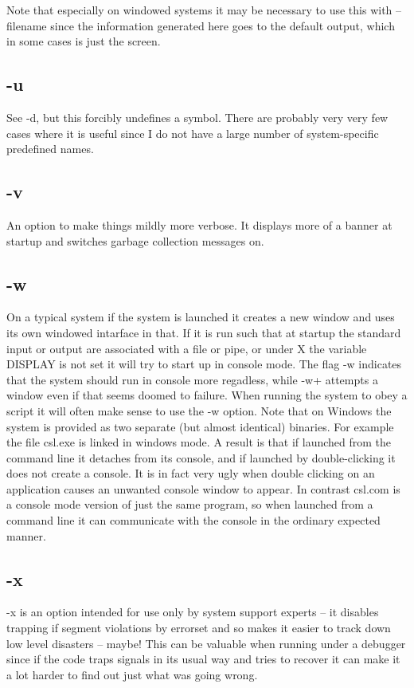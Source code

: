 \documentclass[a4paper,11pt]{article}
\begin{document}
Note that especially on windowed systems it may be necessary to use this
with {\ttfamily -- filename} since the information generated here goes to
the default output, which in some cases is just the screen.
\subsection{\ttfamily -u}
See {\ttfamily -d}, but this forcibly undefines a symbol. There are probably
very very few cases where it is useful since I do not have a large
number of system-specific predefined names.
\subsection{\ttfamily -v}
An option to make things mildly more verbose. It displays more of a banner
at startup and switches garbage collection messages on.
\subsection{\ttfamily -w}
On a typical system if the system is launched it creates a new window and uses
its own windowed intarface in that. If it is run such that at startup the
standard input or output are associated with a file or pipe, or under X the
variable {\ttfamily DISPLAY} is not set it will try to start up in console
mode. The flag {\ttfamily -w} indicates that the system should run in console
more regadless, while {\ttfamily -w+} attempts a window even if that seems
doomed to failure. When running the system to obey a script it will often make
sense to use the {\ttfamily -w} option. Note that on Windows the system is
provided as two separate (but almost identical) binaries. For example the
file {\ttfamily csl.exe} is linked in windows mode. A result is that if
launched from the command line it detaches from its console, and if launched
by double-clicking it does not create a console. It is in fact very ugly when
double clicking on an application causes an unwanted console window to appear.
In contrast {\ttfamily csl.com} is a console mode version of just the same
program, so when launched from a command line it can communicate with the
console in the ordinary expected manner.
\subsection{\ttfamily -x}
{\ttfamily -x} is an option intended for use only by system
support experts -- it disables trapping if segment violations by
errorset and so makes it easier to track down low level disasters --
maybe!  This can be valuable when running under a debugger since if the
code traps signals in its usual way and tries to recover it can make it a lot
harder to find out just what was going wrong.
\end{document}
